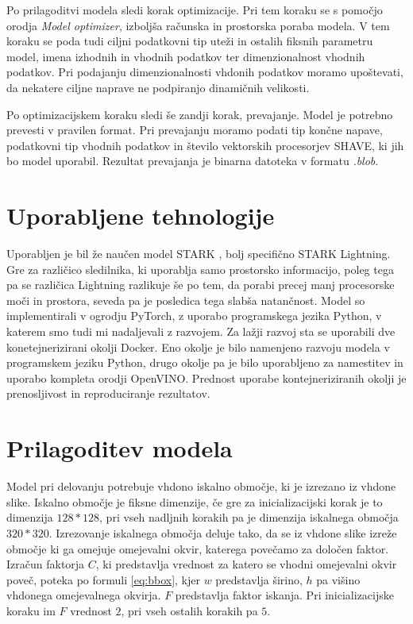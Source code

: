 \documentclass[a4paper,12pt,openright]{book}
\begin{document}
Po prilagoditvi modela sledi korak optimizacije. Pri tem koraku se s pomočjo orodja \emph{Model optimizer}, izboljša računska in prostorska poraba modela. V tem koraku se poda tudi ciljni podatkovni tip uteži in ostalih fiksnih parametru model, imena izhodnih in vhodnih podatkov ter dimenzionalnost vhodnih podatkov. Pri podajanju dimenzionalnosti vhdonih podatkov moramo upoštevati, da nekatere ciljne naprave ne podpiranjo dinamičnih velikosti.

Po optimizacijskem koraku sledi še zandji korak, prevajanje. Model je potrebno prevesti v pravilen format. Pri prevajanju moramo podati tip končne napave, podatkovni tip vhodnih podatkov in število vektorskih procesorjev SHAVE, ki jih bo model uporabil. Rezultat prevajanja je binarna datoteka v formatu \emph{.blob}.

\section{Uporabljene tehnologije}
Uporabljen je bil že naučen model STARK \cite{stark}, bolj specifično STARK Lightning. Gre za različico sledilnika, ki uporablja samo prostorsko informacijo, poleg tega pa se različica Lightning razlikuje še po tem, da porabi precej manj procesorske moči in prostora, seveda pa je posledica tega slabša natančnost. Model so \cite{stark} implementirali v ogrodju PyTorch, z uporabo programskega jezika Python, v katerem smo tudi mi nadaljevali z razvojem. Za lažji razvoj sta se uporabili dve konetejnerizirani okolji Docker. Eno okolje je bilo namenjeno razvoju modela v programskem jeziku Python, drugo okolje pa je bilo uporabljeno za namestitev in uporabo kompleta orodji OpenVINO. Prednost uporabe kontejneriziranih okolji je prenosljivost in reproduciranje rezultatov.

\section{Prilagoditev modela}
Model pri delovanju potrebuje vhdono iskalno območje, ki je izrezano iz vhdone slike. Iskalno območje je fiksne dimenzije, če gre za inicializacijski korak je to dimenzija $128*128$, pri vseh nadljnih korakih pa je dimenzija iskalnega območja $ 320*320 $. Izrezovanje iskalnega območja deluje tako, da se iz vhdone slike izreže območje ki ga omejuje omejevalni okvir, katerega povečamo za določen faktor. Izračun faktorja $C$, ki predstavlja vrednost za katero se vhodni omejevalni okvir poveč, poteka po formuli \ref{eq:bbox}, kjer $w$ predstavlja širino, $h$ pa višino vhdonega omejevalnega okvirja. $F$ predstavlja faktor iskanja. Pri inicializacijske koraku im $F$ vrednost $2$, pri vseh ostalih korakih pa $5$.
\end{document}
